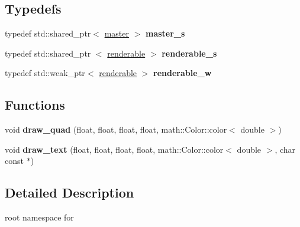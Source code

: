 \subsection*{\-Typedefs}
\begin{DoxyCompactItemize}
\item 
\hypertarget{namespaceglutpp_ad416fff92cdabdc3141618680ccd1945}{typedef std\-::shared\-\_\-ptr$<$ \hyperlink{classglutpp_1_1master}{master} $>$ {\bfseries master\-\_\-s}}\label{namespaceglutpp_ad416fff92cdabdc3141618680ccd1945}

\item 
\hypertarget{namespaceglutpp_a67ccde707354c95f87efe65589d3219d}{typedef std\-::shared\-\_\-ptr\*
$<$ \hyperlink{classglutpp_1_1renderable}{renderable} $>$ {\bfseries renderable\-\_\-s}}\label{namespaceglutpp_a67ccde707354c95f87efe65589d3219d}

\item 
\hypertarget{namespaceglutpp_ab992d93431ecb78e57041c940827dd90}{typedef std\-::weak\-\_\-ptr$<$ \hyperlink{classglutpp_1_1renderable}{renderable} $>$ {\bfseries renderable\-\_\-w}}\label{namespaceglutpp_ab992d93431ecb78e57041c940827dd90}

\end{DoxyCompactItemize}
\subsection*{\-Functions}
\begin{DoxyCompactItemize}
\item 
\hypertarget{namespaceglutpp_a5b9af4831c154ba4ec231fab63680570}{void {\bfseries draw\-\_\-quad} (float, float, float, float, math\-::\-Color\-::color$<$ double $>$)}\label{namespaceglutpp_a5b9af4831c154ba4ec231fab63680570}

\item 
\hypertarget{namespaceglutpp_aad6c0a075c333135facee076655cc27c}{void {\bfseries draw\-\_\-text} (float, float, float, float, math\-::\-Color\-::color$<$ double $>$, char const $\ast$)}\label{namespaceglutpp_aad6c0a075c333135facee076655cc27c}

\end{DoxyCompactItemize}


\subsection{\-Detailed \-Description}
root namespace for  